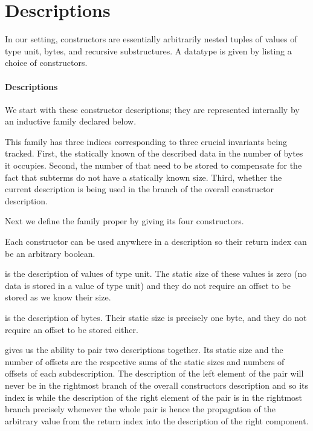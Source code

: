 \section{Descriptions}\label{sec:desc}


In our setting, constructors are essentially arbitrarily nested tuples of
values of type unit,
bytes,
and recursive substructures.
%
A datatype is given by listing a choice of constructors.

\paragraph{Descriptions}
We start with these constructor descriptions;
they are represented internally by an inductive family 
declared below.


This family has three indices corresponding to three crucial
invariants being tracked.
%
First, the statically known  of the described data
in the number of bytes it occupies.
%
Second, the number of  that need to be stored to
compensate for the fact that subterms do not have a statically known
size.
%
Third, whether the current description is being used in the
 branch of the overall constructor description.

Next we define the family proper by giving its four constructors.


Each constructor can be used anywhere in a description so their return
 index can be an arbitrary boolean.

 is the description of values of type unit. The static
size of these values is zero (no data is stored in a value of type unit)
and they do not require an offset to be stored as we know their size.

 is the description of bytes.
%
Their static size is precisely one byte, and they do not require an
offset to be stored either.

 gives us the ability to pair two descriptions together.
Its static size and the number of offsets are the respective sums of the
static sizes and numbers of offsets of each subdescription.
%
The description of the left element of the pair will never be in the
rightmost branch of the overall constructors description and so its
index is  while the description of the right element
of the pair is in the rightmost branch precisely whenever the whole pair
is hence the propagation of the  arbitrary value from the
return index into the description of the right component.

